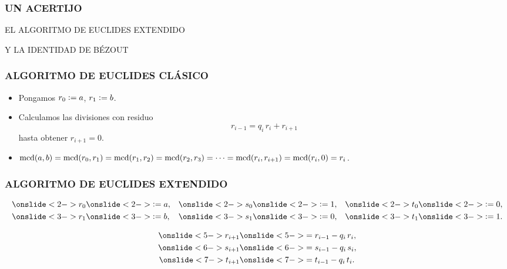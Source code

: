 \begin{frame}
  \frametitle{UN ACERTIJO}

\end{frame}

\begin{frame}

  \vfill

  \begin{center}\huge\headingfont
    EL ALGORITMO DE EUCLIDES EXTENDIDO

    \vspace{1em}

    Y LA IDENTIDAD DE BÉZOUT
  \end{center}

  \vfill
\end{frame}

\begin{frame}
  \frametitle{ALGORITMO DE EUCLIDES CLÁSICO}

  \begin{itemize}
  \item<2-> Pongamos $r_0 \mathrel{\mathop:}= a$, $r_1 \mathrel{\mathop:}= b$.

  \item<3-> Calculamos las divisiones con residuo
    $$r_{i-1} = q_i\,r_i + r_{i+1}$$
    hasta obtener $r_{i+1} = 0$.

  \item<4->
    $\operatorname{mcd} (a,b) = \operatorname{mcd} (r_0,r_1) = \operatorname{mcd} (r_1,r_2) = \operatorname{mcd} (r_2,r_3) = \cdots =
    \operatorname{mcd} (r_i,r_{i+1}) = \operatorname{mcd} (r_i,0) = r_i$.
  \end{itemize}
\end{frame}

\begin{frame}
  \frametitle{ALGORITMO DE EUCLIDES EXTENDIDO}

  \begin{align*}
    \onslide<2->{r_0} & \onslide<2->{\dfn a,} & \onslide<2->{s_0} & \onslide<2->{\dfn 1,} & \onslide<2->{t_0} & \onslide<2->{\dfn 0,} \\
    \onslide<3->{r_1} & \onslide<3->{\dfn b,} & \onslide<3->{s_1} & \onslide<3->{\dfn 0,} & \onslide<3->{t_1} & \onslide<3->{\dfn 1.}
  \end{align*}

  \begin{align*}
    \onslide<5->{r_{i+1}} & \onslide<5->{= r_{i-1} - q_i\,r_i,} \\
    \onslide<6->{s_{i+1}} & \onslide<6->{= s_{i-1} - q_i\,s_i,} \\
    \onslide<7->{t_{i+1}} & \onslide<7->{= t_{i-1} - q_i\,t_i.}
  \end{align*}

\end{frame}

